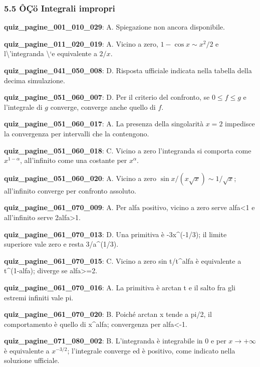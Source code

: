 \documentclass[11pt,a4paper]{article}
\newcounter{quiz}
\begin{document}
\subsubsection*{5.5 ÔÇö Integrali impropri}
\noindent\textbf{quiz\_pagine\_001\_010\_029}: A. Spiegazione non ancora disponibile.\par\medskip
\noindent\textbf{quiz\_pagine\_011\_020\_019}: A. Vicino a zero, $1-\cos x\sim x^2/2$ e l\textbackslash{}'integranda \textbackslash{}`e equivalente a $2/x$.\par\medskip
\noindent\textbf{quiz\_pagine\_041\_050\_008}: D. Risposta ufficiale indicata nella tabella della decima simulazione.\par\medskip
\noindent\textbf{quiz\_pagine\_051\_060\_007}: D. Per il criterio del confronto, se $0\le f\le g$ e l’integrale di $g$ converge, converge anche quello di $f$.\par\medskip
\noindent\textbf{quiz\_pagine\_051\_060\_017}: A. La presenza della singolarità $x=2$ impedisce la convergenza per intervalli che la contengono.\par\medskip
\noindent\textbf{quiz\_pagine\_051\_060\_018}: C. Vicino a zero l’integranda si comporta come $x^{1-\alpha}$, all’infinito come una costante per $x^\alpha$.\par\medskip
\noindent\textbf{quiz\_pagine\_051\_060\_020}: A. Vicino a zero $\sin x/(x\sqrt{x})\sim1/\sqrt{x}$; all’infinito converge per confronto assoluto.\par\medskip
\noindent\textbf{quiz\_pagine\_061\_070\_009}: A. Per alfa positivo, vicino a zero serve alfa<1 e all’infinito serve 2alfa>1.\par\medskip
\noindent\textbf{quiz\_pagine\_061\_070\_013}: D. Una primitiva è -3x\textasciicircum{}(-1/3); il limite superiore vale zero e resta 3/a\textasciicircum{}(1/3).\par\medskip
\noindent\textbf{quiz\_pagine\_061\_070\_015}: C. Vicino a zero sin t/t\textasciicircum{}alfa è equivalente a t\textasciicircum{}(1-alfa); diverge se alfa>=2.\par\medskip
\noindent\textbf{quiz\_pagine\_061\_070\_016}: A. La primitiva è arctan t e il salto fra gli estremi infiniti vale pi.\par\medskip
\noindent\textbf{quiz\_pagine\_061\_070\_020}: B. Poiché arctan x tende a pi/2, il comportamento è quello di x\textasciicircum{}alfa; convergenza per alfa<-1.\par\medskip
\noindent\textbf{quiz\_pagine\_071\_080\_002}: B. L'integranda è integrabile in $0$ e per $x\to+\infty$ è equivalente a $x^{-3/2}$; l'integrale converge ed è positivo, come indicato nella soluzione ufficiale.\par\medskip
\end{document}
